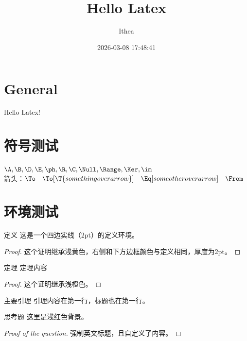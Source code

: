 \documentclass[UTF8]{ctexart} %
\title{Hello Latex}
\author{Ithea}
\date{2026-03-08 17:48:41}
\begin{document}
\section{General}

{\huge
Hello Latex!}

\section{符号测试}
\(\A, \B, \D, \E, \ph, \R, \C, \Null, \Range, \Ker,\im\) \\
箭头：\(\To \quad \To[\T{something over arrow}] \quad \Eq[some other over arrow]\quad \From\)


\section{环境测试}

\begin{define}{定义}
这是一个四边实线（2pt）的定义环境。
\end{define}

\begin{proof}
这个证明继承浅黄色，右侧和下方边框颜色与定义相同，厚度为2pt。
\end{proof}

\begin{theorem}{定理}
定理内容
\end{theorem}

\begin{proof}
这个证明继承浅橙色。
\end{proof}

\begin{lemma}{主要引理}
引理内容在第一行，标题也在第一行。
\end{lemma}

\begin{question}{思考题}
这里是浅红色背景。
\end{question}

\begin{proof}[Proof of the question]
强制英文标题，且自定义了内容。
\end{proof}
\end{document}
